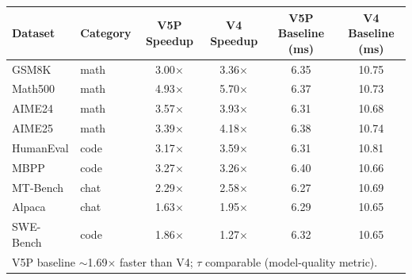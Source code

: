 \centering
\begin{tabular}{l|l|cc|cc}
\toprule
Dataset & Category & V5P Speedup & V4 Speedup & V5P Baseline (ms) & V4 Baseline (ms) \\
\midrule
GSM8K & math & 3.00$\times$ & 3.36$\times$ & 6.35 & 10.75 \\
Math500 & math & 4.93$\times$ & 5.70$\times$ & 6.37 & 10.73 \\
AIME24 & math & 3.57$\times$ & 3.93$\times$ & 6.31 & 10.68 \\
AIME25 & math & 3.39$\times$ & 4.18$\times$ & 6.38 & 10.74 \\
HumanEval & code & 3.17$\times$ & 3.59$\times$ & 6.31 & 10.81 \\
MBPP & code & 3.27$\times$ & 3.26$\times$ & 6.40 & 10.66 \\
MT-Bench & chat & 2.29$\times$ & 2.58$\times$ & 6.27 & 10.69 \\
Alpaca & chat & 1.63$\times$ & 1.95$\times$ & 6.29 & 10.65 \\
SWE-Bench & code & 1.86$\times$ & 1.27$\times$ & 6.32 & 10.65 \\
\midrule
\multicolumn{6}{l}{\footnotesize V5P baseline $\sim$1.69$\times$ faster than V4; $\tau$ comparable (model-quality metric).} \\
\bottomrule
\end{tabular}
